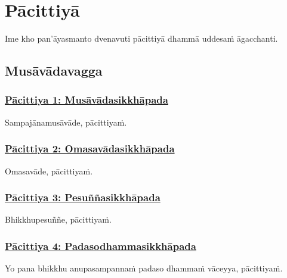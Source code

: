 
\section{Pācittiyā}
\label{pc}

\begin{intro}
	Ime kho pan'āyasmanto dvenavuti pācittiyā dhammā uddesaṁ āgacchanti.
\end{intro}

\subsection{Musāvādavagga}
\label{pc-vagga1}

\subsubsection*{\hyperref[exp1]{Pācittiya 1: Musāvādasikkhāpada}}
\label{pac1}

Sampajānamusāvāde, pācittiyaṁ.



\subsubsection*{\hyperref[exp2]{Pācittiya 2: Omasavādasikkhāpada}}
\label{pac2}

Omasavāde, pācittiyaṁ.



\subsubsection*{\hyperref[exp3]{Pācittiya 3: Pesuññasikkhāpada}}
\label{pac3}

Bhikkhupesuññe, pācittiyaṁ.



\subsubsection*{\hyperref[exp4]{Pācittiya 4: Padasodhammasikkhāpada}}
\label{pac4}

Yo pana bhikkhu anupasampannaṁ\makeatletter\hyperlink{endnote226-appendix}\makeatother{} padaso dhammaṁ vāceyya, pācittiyaṁ.



